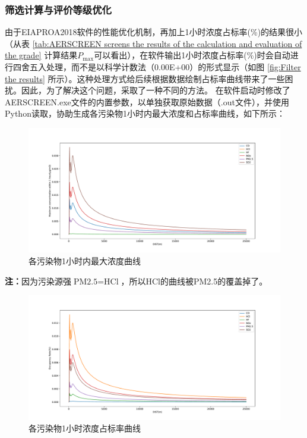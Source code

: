 \subsubsection{筛选计算与评价等级优化}

由于EIAPROA2018软件的性能优化机制，再加上1小时浓度占标率(\%)的结果很小（从表 \ref{tab:AERSCREEN screens the results of the calculation and evaluation of the grade} 计算结果$P_{\mathrm{max}}$可以看出），在软件输出1小时浓度占标率(\%)时会自动进行四舍五入处理，而不是以科学计数法（0.00E+00）的形式显示（如图 \ref{fig:Filter the results} 所示）。这种处理方式给后续根据数据绘制占标率曲线带来了一些困扰。因此，为了解决这个问题，采取了一种不同的方法。
在软件启动时修改了AERSCREEN.exe文件的内置参数，以单独获取原始数据（.out文件），并使用Python读取，协助生成各污染物1小时内最大浓度和占标率曲线，如下所示：

\begin{figure}[H]
    \centering
    \includegraphics[width=\textwidth]{figures/Maximum concentration within 1 hour.pdf}
    \caption{各污染物1小时内最大浓度曲线}
    \label{fig:Maximum concentration within 1 hour}
\end{figure}
\noindent\textbf{注：}因为污染源强$\text{PM2.5}=\text{HCl}$，所以HCl的曲线被PM2.5的覆盖掉了。
\begin{figure}[H]
    \centering
    \includegraphics[width=\textwidth]{figures/1-hour concentration ratio curve.pdf}
    \caption{各污染物1小时浓度占标率曲线}
    \label{fig:1-hour concentration ratio curve}
\end{figure}


